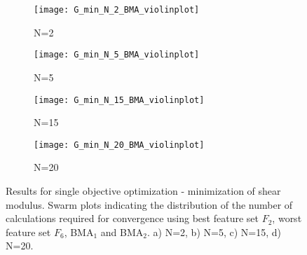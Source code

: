 \documentclass[preprint,amsmath,amssymb,aps, prb,showkeys]{revtex4-1}
\begin{document}
\begin{figure}[htp]
        \parbox{.975\textwidth}{
            \begin{subfigure}{.475\linewidth}
                \texttt{[image: G\_min\_N\_2\_BMA\_violinplot]}
                \caption{N=2}
                \label{fig:min_G_N_2_BMA_swarm}
        \end{subfigure}
            \begin{subfigure}{.475\linewidth}
                \texttt{[image: G\_min\_N\_5\_BMA\_violinplot]}
                \caption{N=5}
                \label{fig:min_G_N_5_BMA_swarm}
        \end{subfigure}
            \begin{subfigure}{.475\linewidth}
                \texttt{[image: G\_min\_N\_15\_BMA\_violinplot]}
                \caption{N=15}
                \label{fig:min_G_N_15_BMA_swarm}
        \end{subfigure}
            \begin{subfigure}{.475\linewidth}
                \texttt{[image: G\_min\_N\_20\_BMA\_violinplot]}
                \caption{N=20}
                \label{fig:min_G_N_20_BMA_swarm}
        \end{subfigure}
        }
        \caption{ Results for single objective optimization - minimization of shear modulus. Swarm plots indicating the distribution of the number of calculations required for convergence using best feature set $F_2$, worst feature set $F_6$, BMA$_1$ and BMA$_2$. a) N=2, b) N=5, c) N=15, d) N=20.}
        \label{fig:min_shear_modulus_BMA_swarm}        
\end{figure} 
\end{document}
